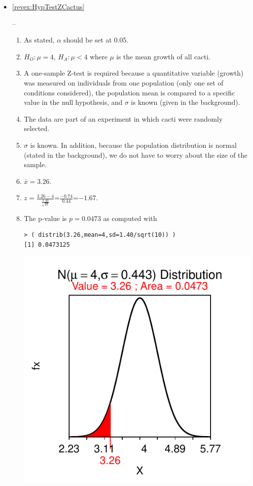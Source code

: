 \documentclass[10pt,openany]{book}\usepackage[]{graphicx}\usepackage[]{color}
\makeatletter
\newenvironment{kframe}{%
 \def\at@end@of@kframe{}%
 \ifinner\ifhmode%
  \def\at@end@of@kframe{\end{minipage}}%
  \begin{minipage}{\columnwidth}%
 \fi\fi%
 \def\FrameCommand##1{\hskip\@totalleftmargin \hskip-\fboxsep
 \colorbox{shadecolor}{##1}\hskip-\fboxsep
     \hskip-\linewidth \hskip-\@totalleftmargin \hskip\columnwidth}%
 \MakeFramed {\advance\hsize-\width
   \@totalleftmargin\z@ \linewidth\hsize
   \@setminipage}}%
 {\par\unskip\endMakeFramed%
 \at@end@of@kframe}
\newenvironment{knitrout}{}{} %
\makeatother
\begin{document}
\begin{itemize}
  \item \hypertarget{ans:HypTestZCactus}{\ref{revex:HypTestZCactus}} --
    \begin{enumerate}
      \item As stated, $\alpha$ should be set at 0.05.
      \item $H_{O}:\mu=4$, $H_{A}:\mu<4$ where $\mu$ is the mean growth of all cacti.
      \item A one-sample Z-test is required because a quantitative variable (growth) was measured on individuals from one population (only one set of conditions considered), the population mean is compared to a specific value in the null hypothesis, and $\sigma$ is known (given in the background).
      \item The data are part of an experiment in which cacti were randomly selected.
      \item $\sigma$ is known.  In addition, because the population distribution is normal (stated in the background), we do not have to worry about the size of the sample.
      \item $\bar{x}=3.26$.
      \item $z=\frac{3.26-4}{\frac{1.40}{\sqrt{10}}}$=$\frac{-0.74}{0.44}$=$-1.67$.
      \item The p-value is $p=0.0473$ as computed with
\begin{knitrout}
\color{fgcolor}\begin{kframe}
\begin{verbatim}
> ( distrib(3.26,mean=4,sd=1.40/sqrt(10)) )
[1] 0.0473125
\end{verbatim}
\end{kframe}

{\centering \includegraphics[width=.4\linewidth]{Figs/unnamed-chunk-346-1} 

}




\end{knitrout}
\end{enumerate}
\end{itemize}
\end{document}

